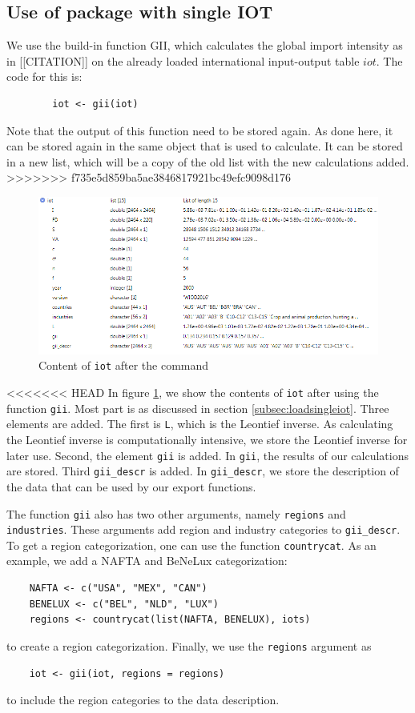 \documentclass[10pt,a4paper]{paper}
\begin{document}
\begin{itemize}
	\subsection{Use of package with single IOT}
	We use the build-in function GII, which calculates the global import intensity as in [[CITATION]] on the already loaded international input-output table $iot$. The code for this is:
	\begin{verbatim}
		iot <- gii(iot)
	\end{verbatim}
	Note that the output of this function need to be stored again. As done here, it can be stored again in the same object that is used to calculate. It can be stored in a new list, which will be a copy of the old list with the new calculations added.
>>>>>>> f735e5d859ba5ae3846817921bc49efc9098d176
	\begin{figure}
	\centering
	\includegraphics[width=1\linewidth]{content_iot_function}
	\caption{Content of \texttt{iot} after the command}
	\label{fig:contentiotfunction}
	\end{figure}

<<<<<<< HEAD
	In figure \ref{fig:contentiotfunction}, we show the contents of \texttt{iot} after using the function \texttt{gii}. Most part is as discussed in section \ref{subsec:loadsingleiot}. Three elements are added. The first is \texttt{L}, which is the Leontief inverse. As calculating the Leontief inverse is computationally intensive, we store the Leontief inverse for later use. Second, the element \texttt{gii} is added. In \texttt{gii}, the results of our calculations are stored. Third \texttt{gii\_descr} is added. In \texttt{gii\_descr}, we store the description of the data that can be used by our export functions.
	
	The function \texttt{gii} also has two other arguments, namely \texttt{regions} and \texttt{industries}. These arguments add region and industry categories to \texttt{gii\_descr}. To get a region categorization, one can use the function \texttt{countrycat}. As an example, we add a NAFTA and BeNeLux categorization:
	\begin{Verbatim}
	NAFTA <- c("USA", "MEX", "CAN")
	BENELUX <- c("BEL", "NLD", "LUX") 
	regions <- countrycat(list(NAFTA, BENELUX), iots)
	\end{Verbatim} 
	to create a region categorization. Finally, we use the \texttt{regions} argument as
	\begin{Verbatim}
	iot <- gii(iot, regions = regions)
	\end{Verbatim}
	to include the region categories to the data description.
	

\end{itemize}
\end{document}
